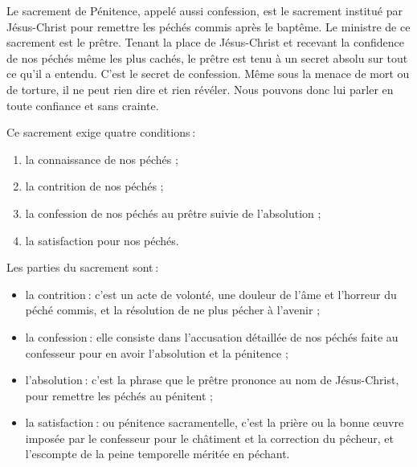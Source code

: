 
\clearpage
{}

Le sacrement de Pénitence, appelé aussi confession, est le sacrement institué par Jésus-Christ pour remettre les péchés commis après le baptême. Le ministre de ce sacrement est le prêtre. Tenant la place de Jésus-Christ et recevant la confidence de nos péchés même les plus cachés, le prêtre est tenu à un secret absolu sur tout ce qu’il a entendu. C’est le secret de confession. Même sous la menace de mort ou de torture, il ne peut rien dire et rien révéler. Nous pouvons donc lui parler en toute confiance et sans crainte.

Ce sacrement exige quatre conditions :
\begin{enumerate}
\item la connaissance de nos péchés ;
\item la contrition de nos péchés ;
\item la confession de nos péchés au prêtre suivie de l’absolution ;
\item la satisfaction pour nos péchés.
\end{enumerate}

\smallskip
Les parties du sacrement sont :
\begin{itemize}
\item la contrition : c’est un acte de volonté, une douleur de l’âme et l’horreur du péché commis, et la résolution de ne plus pécher à l’avenir ;
\item la confession : elle consiste dans l’accusation détaillée de nos péchés faite au confesseur pour en avoir l’absolution et la pénitence ;
\item l'absolution : c’est la phrase que le prêtre prononce au nom de Jésus-Christ, pour remettre les péchés au pénitent ;
\item la satisfaction : ou pénitence sacramentelle, c’est la prière ou la bonne œuvre imposée par le confesseur pour le châtiment et la correction du pêcheur, et l’escompte de la peine temporelle méritée en péchant.
\end{itemize}

